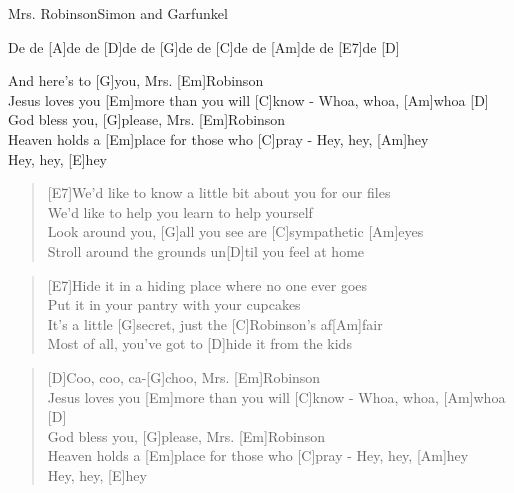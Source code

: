 \begin{song}{Mrs. Robinson}{Simon and Garfunkel}

    \begin{intro}
        [E7]De de [A]de de [D]de de [G]de de [C]de de [Am]de de [E7]de [D]
    \end{intro}

    \begin{chorus}
        [D]And here's to [G]you, Mrs. [Em]Robinson \\
        [G]Jesus loves you [Em]more than you will [C]know - Whoa, whoa, [Am]whoa [D] \\
        God bless you, [G]please, Mrs. [Em]Robinson \\
        [G]Heaven holds a [Em]place for those who [C]pray - Hey, hey, [Am]hey \\
        Hey, hey, [E]hey
    \end{chorus}

    \begin{verse}  
        [E7]We'd like to know a little bit about you for our files \\
        [A7]We'd like to help you learn to help yourself \\
        [D]Look around you, [G]all you see are [C]sympathetic [Am]eyes \\
        [E7]Stroll around the grounds un[D]til you feel at home
    \end{verse}  


    \begin{verse}  
        [E7]Hide it in a hiding place where no one ever goes \\
        [A7]Put it in your pantry with your cupcakes \\
        [D]It's a little [G]secret, just the [C]Robinson's af[Am]fair \\
        [E7]Most of all, you've got to [D]hide it from the kids
    \end{verse}  


    \begin{verse}  
        [D]Coo, coo, ca-[G]choo, Mrs. [Em]Robinson \\
        [G]Jesus loves you [Em]more than you will [C]know - Whoa, whoa, [Am]whoa [D] \\
        God bless you, [G]please, Mrs. [Em]Robinson \\
        [G]Heaven holds a [Em]place for those who [C]pray - Hey, hey, [Am]hey \\
        Hey, hey, [E]hey
    \end{verse}  


\end{song}
